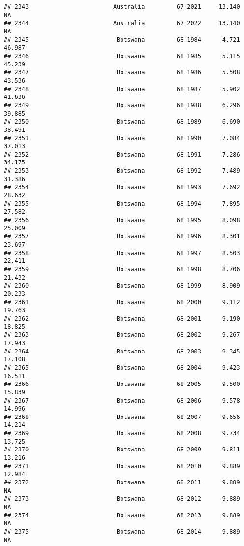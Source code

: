 \documentclass[
]{article}
\begin{document}
\begin{verbatim}
## 2343                        Australia         67 2021     13.140         NA
## 2344                        Australia         67 2022     13.140         NA
## 2345                         Botswana         68 1984      4.721     46.987
## 2346                         Botswana         68 1985      5.115     45.239
## 2347                         Botswana         68 1986      5.508     43.536
## 2348                         Botswana         68 1987      5.902     41.636
## 2349                         Botswana         68 1988      6.296     39.885
## 2350                         Botswana         68 1989      6.690     38.491
## 2351                         Botswana         68 1990      7.084     37.013
## 2352                         Botswana         68 1991      7.286     34.175
## 2353                         Botswana         68 1992      7.489     31.386
## 2354                         Botswana         68 1993      7.692     28.632
## 2355                         Botswana         68 1994      7.895     27.582
## 2356                         Botswana         68 1995      8.098     25.009
## 2357                         Botswana         68 1996      8.301     23.697
## 2358                         Botswana         68 1997      8.503     22.411
## 2359                         Botswana         68 1998      8.706     21.432
## 2360                         Botswana         68 1999      8.909     20.233
## 2361                         Botswana         68 2000      9.112     19.763
## 2362                         Botswana         68 2001      9.190     18.825
## 2363                         Botswana         68 2002      9.267     17.943
## 2364                         Botswana         68 2003      9.345     17.108
## 2365                         Botswana         68 2004      9.423     16.511
## 2366                         Botswana         68 2005      9.500     15.839
## 2367                         Botswana         68 2006      9.578     14.996
## 2368                         Botswana         68 2007      9.656     14.214
## 2369                         Botswana         68 2008      9.734     13.725
## 2370                         Botswana         68 2009      9.811     13.216
## 2371                         Botswana         68 2010      9.889     12.984
## 2372                         Botswana         68 2011      9.889         NA
## 2373                         Botswana         68 2012      9.889         NA
## 2374                         Botswana         68 2013      9.889         NA
## 2375                         Botswana         68 2014      9.889         NA

\end{verbatim}
\end{document}

